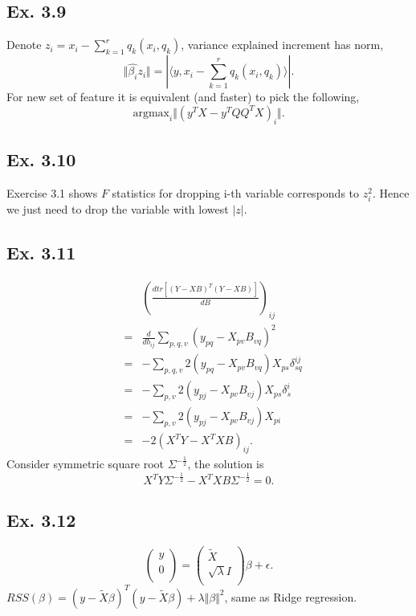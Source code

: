 \subsection*{Ex. 3.9}
Denote $z_{i} = x_{i} - \sum_{k=1}^r q_{k}( x_{i}, q_{k})$, variance explained increment has norm,
$$\Vert\hat{\beta_{i}}z_{i}\Vert = |\langle y, x_{i} - \sum_{k=1}^r q_{k} (x_{i}, q_{k}) \rangle|.$$
For new set of feature it is equivalent (and faster) to pick the following,
$$\mbox{argmax}_{i}\Vert (y^T X - y^TQQ^{T}X)_{i}\Vert.$$
\subsection*{Ex. 3.10}
Exercise 3.1 shows $F$ statistics for dropping i-th variable corresponds to $z^2_i$. Hence we just need to drop the variable with lowest $|z|$.

\subsection*{Ex. 3.11}
\begin{eqnarray*}
    && \left(\frac{d tr[(Y-XB)^{T}(Y-XB)]}{dB}\right)_{ij}\\
    &=& \frac{d}{db_{ij}}\sum_{p,q,v}(y_{pq}-X_{pv}B_{vq})^2\\
    &=& -\sum_{p,q,v}2(y_{pq}-X_{pv}B_{vq})X_{ps}\delta_{sq}^{ij}\\
    &=& -\sum_{p,v}2(y_{pj}-X_{pv}B_{vj})X_{ps}\delta_{s}^{i}\\
    &=& -\sum_{p,v}2(y_{pj}-X_{pv}B_{vj})X_{pi}\\
    &=& -2(X^TY -X^{T}XB)_{ij}.
\end{eqnarray*}
Consider symmetric square root $\Sigma^{-\frac{1}{2}}$, the solution is
$$X^TY\Sigma^{-\frac{1}{2}} -X^{T}XB\Sigma^{-\frac{1}{2}}=0.$$

\subsection*{Ex. 3.12}

$$
    \left(
    \begin{array}{c}
            y \\
            0 \\
        \end{array}
    \right)
    =
    \left(
    \begin{array}{c}
            \widetilde{X}    \\
            \sqrt{\lambda} I \\
        \end{array}
    \right)
    \beta + \epsilon.
$$
$RSS(\beta)=(y-\tilde{X}\beta)^T(y-\tilde{X}\beta)  + \lambda \Vert\beta\Vert^2$, same as Ridge regression.

